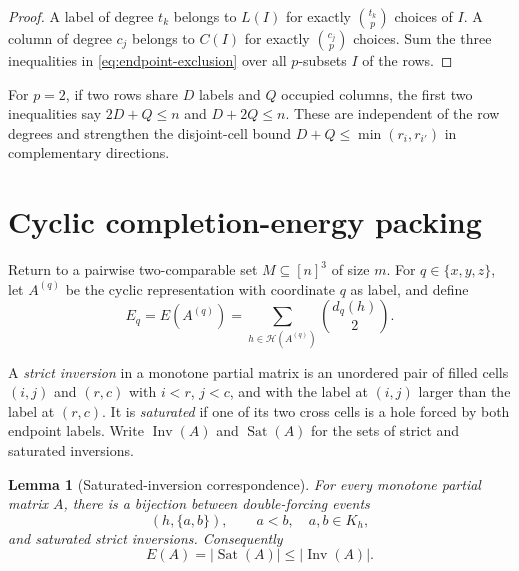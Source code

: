 \documentclass[11pt]{article}
\numberwithin{equation}{section}
\newtheorem{lemma}[theorem]{Lemma}
\theoremstyle{definition}
\theoremstyle{remark}
\newcommand{\Hcal}{\mathcal H}
\newcommand{\Inv}{\operatorname{Inv}}
\newcommand{\Sat}{\operatorname{Sat}}
\begin{document}
\begin{proof}
A label of degree $t_k$ belongs to $L(I)$ for exactly $\binom{t_k}{p}$ choices
of $I$.  A column of degree $c_j$ belongs to $C(I)$ for exactly
$\binom{c_j}{p}$ choices.  Sum the three inequalities in
\eqref{eq:endpoint-exclusion} over all $p$-subsets $I$ of the rows.
\end{proof}

For $p=2$, if two rows share $D$ labels and $Q$ occupied columns, the first
two inequalities say $2D+Q\le n$ and $D+2Q\le n$.  These are independent of
the row degrees and strengthen the disjoint-cell bound
$D+Q\le\min(r_i,r_{i'})$ in complementary directions.

\section{Cyclic completion-energy packing}
\label{sec:cyclic-energy}

Return to a pairwise two-comparable set $M\subseteq[n]^3$ of size $m$.  For
$q\in\{x,y,z\}$, let $A^{(q)}$ be the cyclic representation with coordinate
$q$ as label, and define
\[
 E_q=E(A^{(q)})
 =\sum_{h\in\Hcal(A^{(q)})}\binom{d_q(h)}2.
\]

A \emph{strict inversion} in a monotone partial matrix is an unordered pair
of filled cells $(i,j)$ and $(r,c)$ with $i<r$, $j<c$, and with the label at
$(i,j)$ larger than the label at $(r,c)$.  It is \emph{saturated} if one of
its two cross cells is a hole forced by both endpoint labels.  Write
$\Inv(A)$ and $\Sat(A)$ for the sets of strict and saturated inversions.

\begin{lemma}[Saturated-inversion correspondence]\label{lem:saturated-inversion}
For every monotone partial matrix $A$, there is a bijection between
double-forcing events
\[
 (h,\{a,b\}),\qquad a<b,\quad a,b\in K_h,
\]
and saturated strict inversions.  Consequently
\begin{equation}\label{eq:saturated-inversion-count}
 E(A)=|\Sat(A)|\le |\Inv(A)|.
\end{equation}
\end{lemma}
\end{document}
